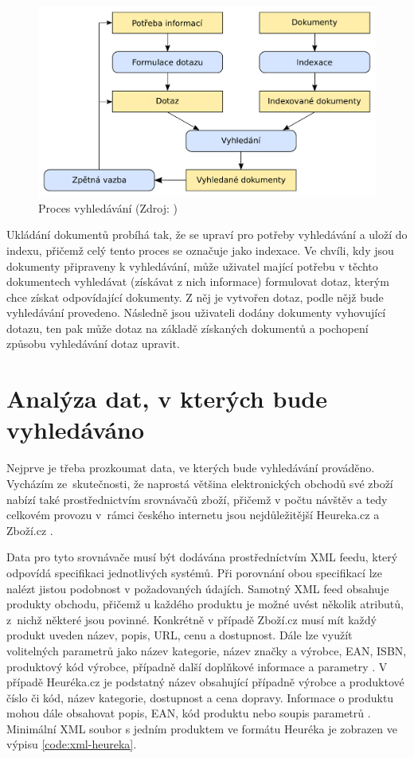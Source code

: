 \documentclass[FM,DP]{tulthesis}
\begin{document}
\begin{figure}[h]
\center
\includegraphics[width=\textwidth]{schema-vyhledavani.pdf}
\caption[Proces vyhledávání]{Proces vyhledávání (Zdroj: \cite{searching})}
\label{schema-vyhledavani}
\end{figure}

Ukládání dokumentů probíhá tak, že se upraví pro potřeby vyhledávání a uloží 
do indexu, přičemž celý tento proces se označuje jako indexace. Ve chvíli, kdy jsou
dokumenty připraveny k vyhledávání, může uživatel mající potřebu v těchto dokumentech 
vyhledávat (získávat z nich informace) formulovat dotaz, kterým chce získat odpovídající
dokumenty. Z něj je vytvořen dotaz, podle nějž bude vyhledávání provedeno. Následně
jsou uživateli dodány dokumenty vyhovující dotazu, ten pak může dotaz na základě
získaných dokumentů a pochopení způsobu vyhledávání dotaz upravit.

\section{Analýza dat, v kterých bude vyhledáváno}

Nejprve je třeba prozkoumat data, ve kterých bude vyhledávání prováděno. Vycházím
ze~skutečnosti, že naprostá většina elektronických obchodů své zboží nabízí také 
prostřednictvím srovnávačů zboží, přičemž v počtu návštěv a tedy celkovém provozu 
v~rámci českého internetu jsou nejdůležitější Heureka.cz a Zboží.cz \cite{netmonitor}. 

Data pro tyto srovnávače musí být dodávána prostředníctvím XML feedu, který odpovídá 
specifikaci jednotlivých systémů. Při porovnání obou specifikací lze nalézt 
jistou podobnost v požadovaných údajích. Samotný XML feed obsahuje
produkty obchodu, přičemž u každého produktu je možné uvést několik atributů, z~nichž
některé jsou povinné. Konkrétně v případě Zboží.cz musí mít každý produkt uveden název, 
popis, URL, cenu a dostupnost. Dále lze využít volitelných parametrů jako název kategorie, 
název značky a výrobce, EAN, ISBN, produktový kód výrobce, případně další doplňkové
informace a parametry \cite{xml-zbozi}. V případě Heuréka.cz je podstatný název
obsahující případně výrobce a produktové číslo či kód, název kategorie, dostupnost a
cena dopravy. Informace o produktu mohou dále obsahovat popis, EAN, kód produktu
nebo soupis parametrů \cite{xml-heureka}. Minimální XML soubor s jedním produktem 
ve formátu Heuréka je zobrazen ve výpisu \ref{code:xml-heureka}.
\end{document}
